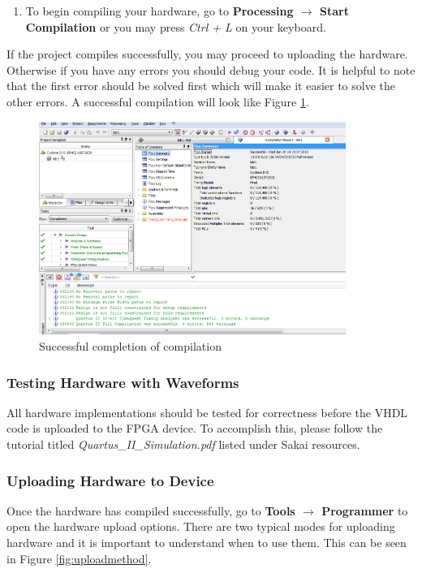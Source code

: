 \begin{enumerate}

	\item To begin compiling your hardware, go to {\bf Processing $\rightarrow$ Start Compilation} or you may press \emph{Ctrl + L} on your keyboard.

\end{enumerate}

If the project compiles successfully, you may proceed to uploading the hardware. Otherwise if you have any errors you should debug your code. It is helpful to note that the first error should be solved first which will make it easier to solve the other errors. A successful compilation will look like Figure \ref{fig:compileresuts}.

\begin{figure}[H]
	\centering
	\includegraphics[width=100mm]{Lab1/figures/compileresults.png}
	\caption{Successful completion of compilation}
	\label{fig:compileresuts}
\end{figure}

\subsubsection{Testing Hardware with Waveforms}

All hardware
implementations should be tested for correctness before the VHDL code is uploaded to the FPGA device. To accomplish this, please follow the tutorial titled \emph{Quartus\_II\_Simulation.pdf} listed under Sakai resources.

\subsubsection{Uploading Hardware to Device}

Once the hardware has compiled successfully, go to {\bf Tools $\rightarrow$ Programmer} to open the hardware upload options. There are two typical modes for uploading hardware and it is important to understand when to use them. This can be seen in Figure \ref{fig:uploadmethod}.


